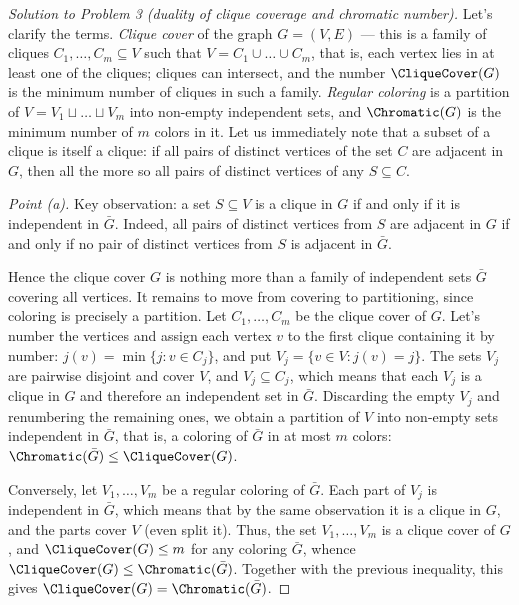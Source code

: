 \documentclass[a4paper,12pt]{report}
\begin{document}
\begin{proof}[Solution to Problem \textup{3} \textup{(}duality of clique coverage and chromatic number\textup{)}]
Let's clarify the terms. \emph{Clique cover} of the graph $G=(V,E)$ --- this is a family of cliques $C_1,\dots,C_m\subseteq V$ such that $V=C_1\cup\dots\cup C_m$, that is, each vertex lies in at least one of the cliques\textup{;} cliques can intersect, and the number $\CliqueCover(G)$ is the minimum number of cliques in such a family. \emph{Regular coloring} is a partition of $V=V_1\sqcup\dots\sqcup V_m$ into non-empty independent sets, and $\Chromatic(G)$ is the minimum number of $m$ colors in it. Let us immediately note that a subset of a clique is itself a clique\textup{:} if all pairs of distinct vertices of the set $C$ are adjacent in $G$, then all the more so all pairs of distinct vertices of any $S\subseteq C$.

\textit{Point \textup{(a)}.} Key observation\textup{:} a set $S\subseteq V$ is a clique in $G$ if and only if it is independent in $\bar G$. Indeed, all pairs of distinct vertices from $S$ are adjacent in $G$ if and only if no pair of distinct vertices from $S$ is adjacent in $\bar G$.

Hence the clique cover $G$ is nothing more than a family of independent sets $\bar G$ covering all vertices. It remains to move from covering to partitioning, since coloring is precisely a partition. Let $C_1,\dots,C_m$ be the clique cover of $G$. Let's number the vertices and assign each vertex $v$ to the first clique containing it by number\textup{:} $j(v)=\min\{j:v\in C_j\}$, and put $V_j=\{v\in V:j(v)=j\}$. The sets $V_j$ are pairwise disjoint and cover $V$, and $V_j\subseteq C_j$, which means that each $V_j$ is a clique in $G$ and therefore an independent set in $\bar G$. Discarding the empty $V_j$ and renumbering the remaining ones, we obtain a partition of $V$ into non-empty sets independent in $\bar G$, that is, a coloring of $\bar G$ in at most $m$ colors\textup{:} $\Chromatic(\bar G)\le\CliqueCover(G)$.

Conversely, let $V_1,\dots,V_m$ be a regular coloring of $\bar G$. Each part of $V_j$ is independent in $\bar G$, which means that by the same observation it is a clique in $G$, and the parts cover $V$ (even split it). Thus, the set $V_1,\dots,V_m$ is a clique cover of $G$, and $\CliqueCover(G)\le m$ for any coloring $\bar G$, whence $\CliqueCover(G)\le\Chromatic(\bar G)$. Together with the previous inequality, this gives $\CliqueCover(G)=\Chromatic(\bar G)$.


\end{proof}
\end{document}
